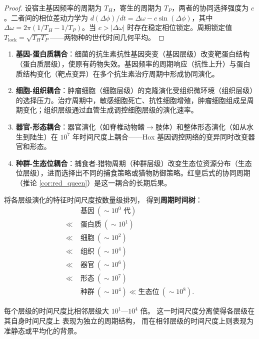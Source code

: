 \begin{proof}
设宿主基因频率的周期为 $T_H$，寄生的周期为 $T_P$，两者的协同选择强度为 $c$。二者间的相位差动力学为 $d(\Delta\phi)/dt = \Delta\omega - c \sin(\Delta\phi)$，其中 $\Delta\omega = 2\pi(1/T_H - 1/T_P)$。当 $c > |\Delta\omega|$ 时存在稳定相位锁定。周期锁定值 $T_{\text{lock}} = \sqrt{T_H T_P}$——两物种的世代时间几何平均。
\end{proof}

\begin{example}[多尺度演化在生物周期结构中的具体表现]
\begin{enumerate}[label=(\roman*)]
    \item \textbf{基因-蛋白质耦合}：细菌的抗生素抗性基因突变（基因层级）改变靶蛋白结构（蛋白质层级），使原有药物失效。基因频率的周期响应（抗性上升）与蛋白质结构变化（靶点变异）在多个抗生素治疗周期中形成协同演化。
    \item \textbf{细胞-组织耦合}：肿瘤细胞（细胞层级）的克隆演化受组织微环境（组织层级）的选择压力。治疗周期中，敏感细胞死亡、抗性细胞增殖，肿瘤细胞组成呈周期变化；组织层级通过血管生成调控细胞层级的演化速率。
    \item \textbf{器官-形态耦合}：器官演化（如脊椎动物鳍$\to$肢体）和整体形态演化（如从水生到陆生）在 $10^7$ 年时间尺度上耦合——Hox 基因调控网络的变异同时改变器官和形态。
    \item \textbf{种群-生态位耦合}：捕食者-猎物周期（种群层级）改变生态位资源分布（生态位层级），进而选择出不同的捕食策略或猎物防御策略。红皇后式的协同周期（推论 \ref{cor:red_queen}）是这一耦合的长期后果。
\end{enumerate}
\end{example}

\begin{theorem}[多尺度演化的周期时间树]
\label{thm:multi_scale_period_tree}
将各层级演化的特征时间尺度按数量级排列，
得到\textbf{周期时间树}：
\[
\begin{aligned}
&\text{基因} \ (\sim 10^0 \text{ 代}) \\
\ll\;&\text{蛋白质} \ (\sim 10^1) \\
\ll\;&\text{细胞} \ (\sim 10^2) \\
\ll\;&\text{组织} \ (\sim 10^4) \\
\ll\;&\text{器官} \ (\sim 10^6) \\
\ll\;&\text{形态} \ (\sim 10^7) \\[4pt]
&\text{种群} \ (\sim 10^4) \ll \text{生态位} \ (\sim 10^8).
\end{aligned}
\]

每个层级的时间尺度比相邻层级大 $10^1$—$10^4$ 倍。
这一时间尺度分离使得各层级在其自身时间尺度上
表现为独立的周期结构，
而在相邻层级的时间尺度上则表现为
准静态或平均化的背景。
\end{theorem}

